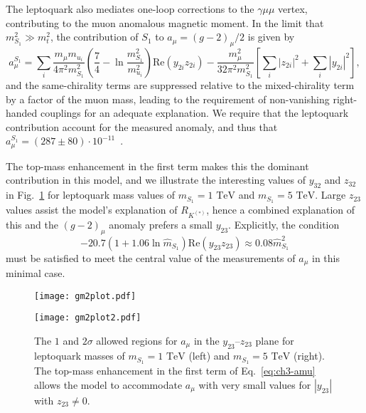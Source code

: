 The leptoquark also mediates one-loop corrections to the $\gamma \mu \mu$ vertex,
contributing to the muon anomalous magnetic moment. In the limit that $m_{S_{1}}^2
\gg m_t^2$, the contribution of $S_{1}$ to $a_\mu = (g - 2)_\mu/2$ is given
by~\cite{Bauer:2015knc, Djouadi:1989md, Chakraverty:2001yg, Cheung:2001ip}
\begin{equation} \label{eq:ch3-amu}
  a_\mu^{S_{1}} = \sum_{i} \frac{m_\mu m_{u_i}}{4\pi^2 m_{S_{1}}^2} \left(
    \frac{7}{4} - \ln \frac{m_{S_{1}}^2}{m_{u_i}^2} \right) \text{Re} %
  (y_{2i} z_{2 i}) - \frac{m_\mu^2}{32 \pi^2 m_{S_{1}}^2}
  \left[ \sum_i |z_{2 i}|^2 + \sum_i |y_{2 i}|^2 \right],
\end{equation}
and the same-chirality terms are suppressed relative to the mixed-chirality term
by a factor of the muon mass, leading to the requirement of non-vanishing
right-handed couplings for an adequate explanation. We require that the
leptoquark contribution account for the measured anomaly, and thus that
$a_\mu^{S_{1}} = (287 \pm 80) \cdot 10^{-11}$~\cite{Davier:2010nc}.

The top-mass enhancement in the first term makes this the dominant contribution
in this model, and we illustrate the interesting values of $y_{32}$ and $z_{32}$
in Fig.~\ref{fig:ch3-gm2plots} for leptoquark mass values of $m_{S_{1}}=1 \text{ TeV}$
and $m_{S_{1}}=5 \text{ TeV}$. Large $z_{23}$ values assist the model's explanation
of $R_{K^{(*)}}$, hence a combined explanation of this and the $(g-2)_\mu$ anomaly
prefers a small $y_{23}$. Explicitly, the condition~\cite{Bauer:2015knc}
\begin{equation} \label{eq:ch3-bnamueq}
  -20.7 (1 + 1.06 \ln\hat{m}_{S_{1}}) \text{Re}(y_{23} z_{23}) \approx 0.08 \hat{m}_{S_{1}}^2
\end{equation}
must be satisfied to meet the central value of the measurements of $a_\mu$ in
this minimal case.

\begin{figure}[t]
  \centering
\begin{minipage}[t]{.45\linewidth}
\centering \texttt{[image: gm2plot.pdf]}
 \label{fig:ch3-gm2plot}
\end{minipage}%
\hfill
\begin{minipage}[t]{.45\linewidth}
\centering \texttt{[image: gm2plot2.pdf]}
 \label{fig:ch3-gm2plot2}
\end{minipage}
\caption[The $1$ and $2\sigma$ allowed regions for $a_\mu$ in the
$y_{23}$--$z_{23}$ plane for leptoquark masses of $m_{S_{1}} = 1 \text{ TeV}$
(left) and $m_{S_{1}} = 5 \text{ TeV}$ (right).]{The $1$ and $2\sigma$ allowed
  regions for $a_\mu$ in the $y_{23}$--$z_{23}$ plane for leptoquark masses of
  $m_{S_{1}} = 1 \text{ TeV}$ (left) and $m_{S_{1}} = 5 \text{ TeV}$ (right). The
  top-mass enhancement in the first term of Eq.~\eqref{eq:ch3-amu} allows the model
  to accommodate $a_\mu$ with very small values for $|y_{23}|$ with
  $z_{23} \neq 0$.}\label{fig:ch3-gm2plots}
\end{figure}

